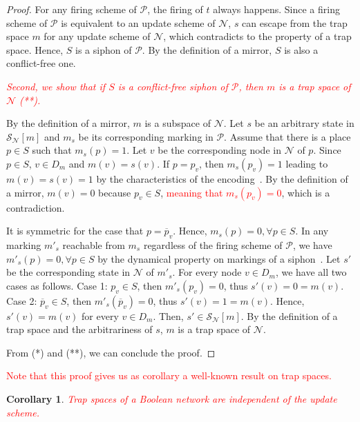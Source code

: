 \documentclass[preprint,12pt]{elsarticle}
\newtheorem{corollary}{Corollary}[section]
\newcommand{\change}[1]{\textcolor{red}{#1}}
\begin{document}
\begin{proof}
  For any firing scheme of \(\mathcal{P}\), the firing of \(t\) always happens.
  Since a firing scheme of \(\mathcal{P}\) is equivalent to an update scheme of \(\mathcal{N}\), \(s\) can escape from the trap space \(m\) for any update scheme of \(\mathcal{N}\), which contradicts to the property of a trap space.
  Hence, \(S\) is a siphon of \(\mathcal{P}\).
  By the definition of a mirror, \(S\) is also a conflict-free one.

  \change{\textit{Second, we show that if \(S\) is a conflict-free siphon of \(\mathcal{P}\), then \(m\) is a trap space of \(\mathcal{N}\) (**).}}

  By the definition of a mirror, \(m\) is a subspace of \(\mathcal{N}\).
  Let \(s\) be an arbitrary state in \(\mathcal{S}_{\mathcal{N}}[m]\) and \(m_s\) be its corresponding marking in \(\mathcal{P}\).
  Assume that there is a place \(p \in S\) such that \(m_s(p) = 1\).
  Let \(v\) be the corresponding node in \(\mathcal{N}\) of \(p\).
  Since \(p \in S\), \(v \in D_m\) and \(m(v) = s(v)\).
  If \(p = p_{v}\), then \(m_s(p_{v}) = 1\) leading to \(m(v) = s(v) = 1\) by the characteristics of the encoding~\cite{chaouiya2004qualitative}.
  By the definition of a mirror, \(m(v) = 0\) because \(p_{v} \in S\), \change{meaning that \(m_s(p_{v}) = 0\)}, which is a contradiction.

  It is symmetric for the case that \(p = \overline{p}_{v}\).
  Hence, \(m_s(p) = 0, \forall p \in S\).
  In any marking \(m'_s\) reachable from \(m_s\) regardless of the firing scheme of \(\mathcal{P}\), we have \(m'_s(p) = 0, \forall p \in S\) by the dynamical property on markings of a siphon~\cite{DBLP:journals/isci/LiuB16}.
  Let \(s'\) be the corresponding state in \(\mathcal{N}\) of \(m'_s\).
  For every node \(v \in D_m\), we have all two cases as follows.
  Case 1: \(p_v \in S\), then \(m'_s(p_v) = 0\), thus \(s'(v) = 0 = m(v)\).
  Case 2: \(\overline{p}_v \in S\), then \(m'_s(\overline{p}_v) = 0\), thus \(s'(v) = 1 = m(v)\).
  Hence, \(s'(v) = m(v)\) for every \(v \in D_m\).
  Then, \(s' \in \mathcal{S}_{\mathcal{N}}[m]\).
  By the definition of a trap space and the arbitrariness of \(s\), \(m\) is a trap space of \(\mathcal{N}\).

  From (*) and (**), we can conclude the proof.
\end{proof}

\change{Note that this proof gives us as corollary a well-known result on trap spaces.}

\begin{corollary}
  \change{Trap spaces of a Boolean network are independent of the update scheme.}
\end{corollary}
\end{document}
